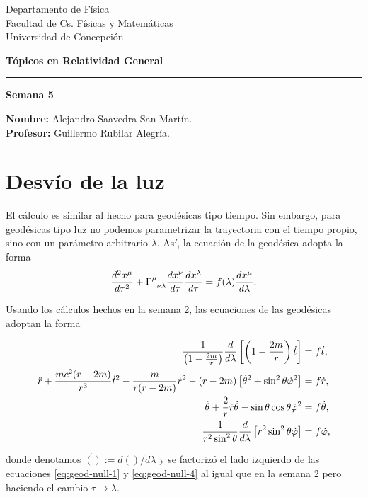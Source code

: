 \documentclass[letterpaper,11pt]{article}
\begin{document}
\pagestyle{plain}

\begin{flushleft}\vspace{-2cm}
Departamento de Física \\
Facultad de Cs. Físicas y Matemáticas\\
Universidad de Concepción
\end{flushleft}

\begin{flushright}\vspace{-1.5cm}
\textbf{Tópicos en Relatividad General} 
\end{flushright}



\rule{\linewidth}{0.1mm}

\begin{center}
\textbf{\LARGE Semana 5}
\end{center}

\begin{flushleft}
\textbf{Nombre:} Alejandro Saavedra San Martín. \\
\textbf{Profesor:} Guillermo Rubilar Alegría.
\end{flushleft}

\section*{Desvío de la luz}

El cálculo es similar al hecho para geodésicas tipo tiempo. Sin embargo, para geodésicas tipo luz no podemos parametrizar la trayectoria con el tiempo propio, sino con un parámetro arbitrario $\lambda$. Así, la ecuación de la geodésica adopta la forma
\begin{equation}
    \frac{d^2 x^{\mu}}{d\tau^2} + \Gamma\indices{^\mu_{\nu \lambda}} \frac{dx^{\nu}}{d\tau} \frac{dx^{\lambda}}{d\tau} = f(\lambda) \frac{dx^{\mu}}{d\lambda}.
\end{equation}

Usando los cálculos hechos en la semana 2, las ecuaciones de las geodésicas adoptan la forma
\begin{shaded}
\begin{align}
\frac{1}{\left(1 - \frac{2m}{r}\right)} \frac{d}{d\lambda}\left[\left( 1 - \frac{2m}{r} \right) \dot{t}\right] &= f \dot{t}, \label{eq:geod-null-1} \\    \Ddot{r} + \frac{mc^2(r-2m)}{r^3} \dot{t}^2 - \frac{m}{r(r-2m)} \dot{r}^2 - (r-2m) \left[\dot{\theta}^2 + \sin^2\theta \dot{\varphi}^2 \right]  &= f \dot{r}, \label{eq:geod-null-2} \\
\Ddot{\theta} + \frac{2}{r} \dot{r} \dot{\theta} - \sin\theta\cos\theta \dot{\varphi}^2 &= f\dot{\theta}, \label{eq:geod-time-3} \\
\frac{1}{r^2\sin^2\theta} \frac{d}{d\lambda} \left[r^2\sin^2\theta \dot{\varphi} \right] &= f \dot{\varphi}, \label{eq:geod-null-4}
\end{align}
\end{shaded}
donde denotamos $\dot{()} := d()/d\lambda$ y se factorizó el lado izquierdo de las ecuaciones \eqref{eq:geod-null-1} y \eqref{eq:geod-null-4} al igual que en la semana 2 pero haciendo el cambio $\tau \to \lambda$. 
\end{document}
